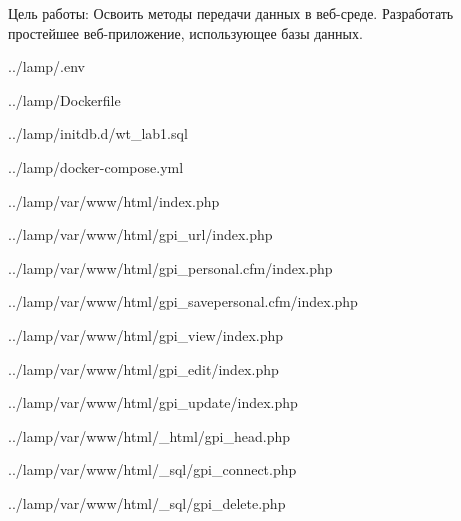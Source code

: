 Цель работы:
Освоить методы передачи данных в веб-среде.
Разработать простейшее веб-приложение, использующее базы данных.


{../lamp/.env}


{../lamp/Dockerfile}


{../lamp/initdb.d/wt_lab1.sql}

\newpage


{../lamp/docker-compose.yml}


{../lamp/var/www/html/index.php}

\newpage


{../lamp/var/www/html/gpi_url/index.php}


{../lamp/var/www/html/gpi_personal.cfm/index.php}


{../lamp/var/www/html/gpi_savepersonal.cfm/index.php}


{../lamp/var/www/html/gpi_view/index.php}


{../lamp/var/www/html/gpi_edit/index.php}


{../lamp/var/www/html/gpi_update/index.php}


{../lamp/var/www/html/_html/gpi_head.php}


{../lamp/var/www/html/_sql/gpi_connect.php}


{../lamp/var/www/html/_sql/gpi_delete.php}
